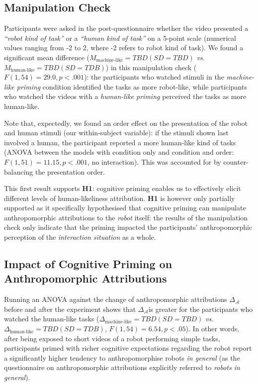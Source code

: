 \documentclass[lettersize, noapacite, twoside, HRI]{apa_HRI}
\newcommand{\vs}{\textit{vs.}\xspace}
\newcommand{\h}[1]{\textbf{H#1}\xspace}
\newcommand{\deltaant}{{$\Delta_{\mathcal{A}}$\xspace}}
\begin{document}
\subsection{Manipulation Check}



Participants were asked in the post-questionnaire whether the video presented a
\emph{``robot kind of task''} or a \emph{``human kind of task''} on a 5-point
scale (numerical values ranging from -2 to 2, where -2 refers to robot kind of
task). We found a significant mean difference ($M_{\text{machine-like}}=TBD (SD=TBD)$
\vs $M_{\text{human-like}}=TBD (SD=TDB)$) in this
manipulation check ($F(1,54) = 29.0, p < .001$): the participants who watched
stimuli in the \emph{machine-like priming} condition identified the tasks as more
robot-like, while participants who watched the videos with a \emph{human-like
priming} perceived the tasks as more human-like.

Note that, expectedly, we found an order effect on the presentation of the robot
and human stimuli (our within-subject variable): if the stimuli shown last
involved a human, the participant reported a more human-like kind of tasks
(ANOVA between the models with condition only and condition and order: $F(1,51)
= 11.15, p < .001$, no interaction). This was accounted for by counter-balancing
the presentation order.

This first result supports \h{1}: cognitive priming enables us to
effectively elicit different levels of human-likeliness attribution.
\h{1} is however only partially supported as it specifically hypothesised that cognitive
priming can manipulate anthropomorphic attributions to the \emph{robot} itself:
the results of the manipulation check only indicate that the priming impacted
the participants' anthropomorphic perception of the \emph{interaction
situation} as a whole.

\subsection{Impact of Cognitive Priming on Anthropomorphic Attributions}

Running an ANOVA against the change of anthropomorphic attributions
\deltaant before and after the experiment shows that \deltaant is greater for the participants who watched the
human-like tasks ($\Delta_{\text{machine-like}}=TBD (SD=TBD)$
\vs $\Delta_{\text{human-like}}=TBD (SD=TDB)$, $F(1,54) = 6.54, p < .05$). In other words, after being exposed to short videos of a robot
performing simple tasks, participants primed with richer cognitive
expectations regarding the robot report a significantly higher tendency to anthropomorphise robots
\emph{in general} (as the questionnaire on anthropomorphic attributions
explicitly referred to \emph{robots in general}).
\end{document}
